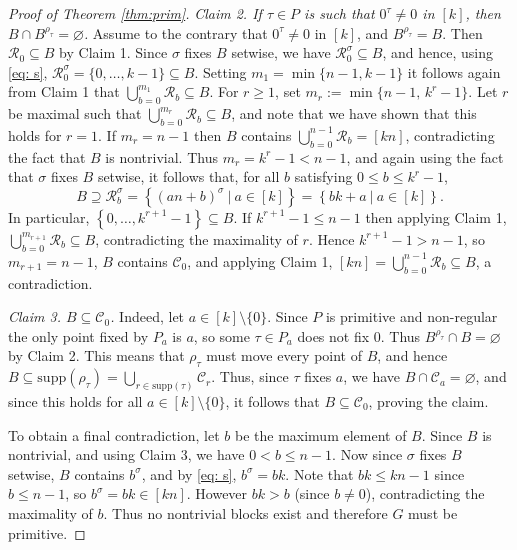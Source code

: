 \documentclass[12pt]{amsart}
\theoremstyle{remark}
\theoremstyle{definition}
\newcounter{claim}[thm]
\newcommand{\supp}{\mathrm{supp}}
\begin{document}
\begin{proof}[Proof of Theorem \ref{thm:prim}]
\medskip\noindent
\emph{Claim 2. If $\tau \in P$ is such that $0^\tau \ne 0$ in $[k]$, then $B \cap B^{\rho_\tau} = \varnothing$.} \quad Assume to the contrary that $0^\tau \neq 0$ in $[k]$, and $B^{\rho_\tau} = B$. Then $\mathcal{R}_0 \subseteq B$ by Claim 1. Since $\sigma$ fixes $B$ setwise, we have  $\mathcal{R}_0^\sigma  \subseteq B$, and hence, using \eqref{eq: s}, $\mathcal{R}_0^\sigma = \{0, \ldots, k-1\}  \subseteq B$. Setting $m_1 = \min\{n-1, k-1\}$ it follows again from Claim 1 that $\bigcup_{b=0}^{m_1} \mathcal{R}_b \subseteq B$. For $r \geqslant 1$, set $m_r := \min\{n-1,\,k^r-1\}$. Let $r$ be maximal such that $\bigcup_{b=0}^{m_r} \mathcal{R}_b \subseteq B$, and note that we have shown that this holds for $r=1$. If $m_r = n-1$ then $B$ contains $\bigcup_{b=0}^{n-1} \mathcal{R}_b =[kn]$, contradicting the fact that $B$ is nontrivial. Thus $m_r = k^r-1 < n-1$, and again using the fact that $\sigma$ fixes $B$ setwise, it follows that, for all $b$ satisfying $0 \leqslant b \leqslant k^r - 1$,  
	\[ 
	B \supseteq \mathcal R_b^\sigma = \left\{ (an+b)^\sigma \ | \ a \in [k] \right\} =	\left\{ bk+a \ | \ a \in [k] \right\}. 
	\]
In particular, $\left\{ 0, \ldots, k^{r+1}-1 \right\} \subseteq B$. If $k^{r+1}-1 \leqslant n-1$ then applying Claim 1, $\bigcup_{b=0}^{m_{r+1}} \mathcal R_b \subseteq B$, contradicting the maximality of $r$. Hence $k^{r+1}-1 > n-1$, so $m_{r+1} = n-1$, $B$ contains $\mathcal{C}_0$, and  applying Claim 1, $[kn] = \bigcup_{b=0}^{n-1} \mathcal R_b \subseteq B$, a contradiction.

\medskip\noindent
\emph{Claim 3. $B \subseteq \mathcal{C}_0$.} \quad Indeed, let $a \in [k] \setminus \{0\}$. Since $P$ is primitive and non-regular the only point fixed by $P_a$ is $a$, so some $\tau \in P_a$ does not fix $0$. Thus $B^{\rho_\tau} \cap B = \varnothing$ by Claim 2. This means that $\rho_\tau$ must move every point of $B$, and hence $B \subseteq \supp(\rho_\tau) = \bigcup_{r \in \supp(\tau)} \mathcal{C}_r$. Thus, since $\tau$ fixes $a$, we have  $B \cap \mathcal{C}_a = \varnothing$, and since this holds for all $a\in [k]\setminus\{0\}$, 
it follows that $B \subseteq \mathcal{C}_0$, proving the claim. 

To obtain a final contradiction, let $b$ be the maximum element of $B$. Since $B$ is nontrivial, and using Claim 3, we have $0 < b \leqslant n-1$. Now since $\sigma$ fixes $B$ setwise, $B$ contains $b^\sigma$, and by \eqref{eq: s}, $b^\sigma  = bk$. Note that $bk\leqslant kn-1$ since $b\leqslant n-1$, so $b^\sigma
=bk\in [kn]$. However $bk > b$ (since $b \ne 0$), contradicting the maximality of $b$. Thus no nontrivial blocks exist and therefore $G$ must be primitive.
\end{proof}
\end{document}
